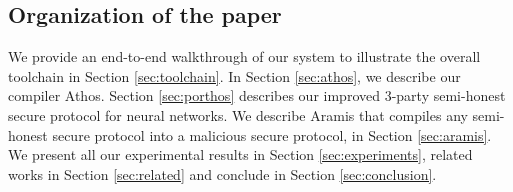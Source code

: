 \subsection{Organization of the paper} We provide an end-to-end walkthrough of our system to illustrate the overall toolchain in Section \ref{sec:toolchain}. %
In Section \ref{sec:athos}, we describe our compiler Athos. Section \ref{sec:porthos} describes our improved 3-party semi-honest secure protocol for neural networks. We describe Aramis that compiles any semi-honest secure protocol into a malicious secure protocol, in Section \ref{sec:aramis}. We present all our experimental results in Section \ref{sec:experiments}, related works in Section \ref{sec:related} and conclude in Section \ref{sec:conclusion}.


